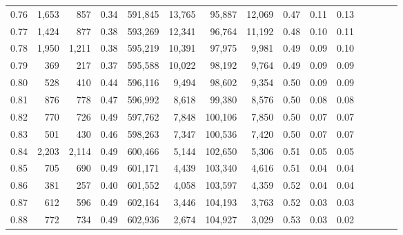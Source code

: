 \begin{tabular}{rrrcrrrrrrrrrrr}
0.76 &   1,653 &    857 &                                       0.34 &  591,845 &   13,765 &   95,887 &   12,069 &  0.47 &  0.11 &                         0.13 \\
0.77 &   1,424 &    877 &                                       0.38 &  593,269 &   12,341 &   96,764 &   11,192 &  0.48 &  0.10 &                         0.11 \\
0.78 &   1,950 &  1,211 &                                       0.38 &  595,219 &   10,391 &   97,975 &    9,981 &  0.49 &  0.09 &                         0.10 \\
0.79 &     369 &    217 &                                       0.37 &  595,588 &   10,022 &   98,192 &    9,764 &  0.49 &  0.09 &                         0.09 \\
0.80 &     528 &    410 &                                       0.44 &  596,116 &    9,494 &   98,602 &    9,354 &  0.50 &  0.09 &                         0.09 \\
0.81 &     876 &    778 &                                       0.47 &  596,992 &    8,618 &   99,380 &    8,576 &  0.50 &  0.08 &                         0.08 \\
0.82 &     770 &    726 &                                       0.49 &  597,762 &    7,848 &  100,106 &    7,850 &  0.50 &  0.07 &                         0.07 \\
0.83 &     501 &    430 &                                       0.46 &  598,263 &    7,347 &  100,536 &    7,420 &  0.50 &  0.07 &                         0.07 \\
0.84 &   2,203 &  2,114 &                                       0.49 &  600,466 &    5,144 &  102,650 &    5,306 &  0.51 &  0.05 &                         0.05 \\
0.85 &     705 &    690 &                                       0.49 &  601,171 &    4,439 &  103,340 &    4,616 &  0.51 &  0.04 &                         0.04 \\
0.86 &     381 &    257 &                                       0.40 &  601,552 &    4,058 &  103,597 &    4,359 &  0.52 &  0.04 &                         0.04 \\
0.87 &     612 &    596 &                                       0.49 &  602,164 &    3,446 &  104,193 &    3,763 &  0.52 &  0.03 &                         0.03 \\
0.88 &     772 &    734 &                                       0.49 &  602,936 &    2,674 &  104,927 &    3,029 &  0.53 &  0.03 &                         0.02 \\

\end{tabular}
